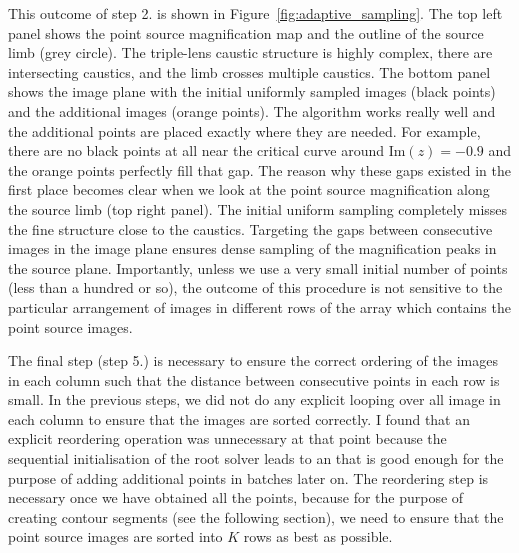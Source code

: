 \documentclass[12pt,dvipsnames]{report}
\begin{document}
This outcome of step 2. is shown in Figure~\ref{fig:adaptive_sampling}. 
The top left panel shows
the point source magnification map and the outline of the source limb (grey circle). The triple-lens
caustic structure is highly complex, there are intersecting caustics, and the limb 
crosses multiple caustics. The bottom panel shows the image plane with the initial uniformly 
sampled images (black points) and the additional images (orange points). The algorithm 
works really well and the additional points are placed exactly where they are needed. 
For example, there are no black points at all near the critical curve  around 
$\mathrm{Im}(z)=-0.9$ and the orange points perfectly fill that gap. The reason why these 
gaps existed in the first place becomes clear when we look at the  point source magnification 
along the source limb (top right panel). The initial uniform sampling 
completely misses the fine structure close  to the caustics. Targeting the gaps between 
consecutive images in the image plane ensures 
dense sampling of the magnification peaks in the source plane. 
Importantly, unless we use a very small initial number of points (less than a hundred or so), 
the outcome of this procedure is 
not sensitive  to the particular arrangement of images in different rows of the array
which contains the point source images.

The final step (step 5.) is necessary to ensure the correct ordering of the images in each column 
such that the distance between consecutive points in each row is small. 
In the previous steps, we did not do any explicit looping over all image in each column to 
ensure that the images are sorted correctly. I found that an explicit reordering operation was 
unnecessary at that point because the sequential initialisation of the root solver leads to 
an that is good enough for the purpose of adding additional points in batches later on. 
The reordering step is necessary once we have obtained all the points,
because for the purpose of creating contour segments (see the following section), 
we need to ensure that the point source images are sorted into $K$ rows as best as possible. 
\end{document}

